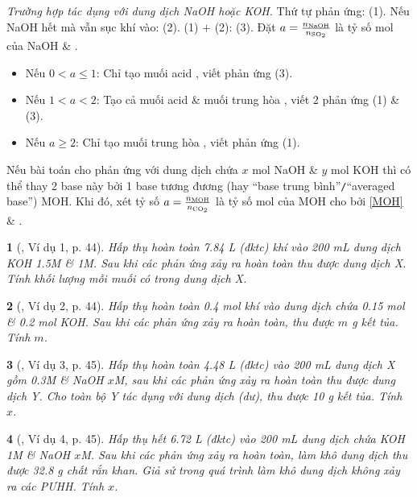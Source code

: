 \documentclass{article}
\newtheorem{baitoan}{}
\begin{document}
\noindent\textit{Trường hợp  tác dụng với dung dịch NaOH hoặc KOH.} Thứ tự phản ứng:  (1). Nếu NaOH hết mà vẫn sục khí  vào:  (2). (1) $+$ (2):  (3). Đặt $a = \frac{n_{\rm NaOH}}{n_{\ce{SO2}}}$ là tỷ số mol của NaOH \& .
\begin{itemize}
	\item Nếu $0 < a\le 1$: Chỉ tạo muối acid , viết phản ứng (3).
	\item Nếu $1 < a < 2$: Tạo cả muối acid  \& muối trung hòa , viết 2 phản ứng (1) \& (3).
	\item Nếu $a\ge 2$: Chỉ tạo muối trung hòa , viết phản ứng (1).
\end{itemize}
Nếu bài toán cho  phản ứng với dung dịch chứa $x$ mol NaOH \& $y$ mol KOH thì có thể thay 2 base này bởi 1 base tương đương (hay ``base trung bình''{\tt/}``averaged base'') MOH. Khi đó, xét tỷ số $a = \frac{n_{\rm MOH}}{n_{\ce{CO2}}}$ là tỷ số mol của MOH cho bởi \eqref{MOH} \& .

\begin{baitoan}[\cite{Truong_Long_Huong_bdhsg_Hoa_Hoc_9}, Ví dụ 1, p. 44]
	Hấp thụ hoàn toàn {\rm7.84 L} (đktc) khí {\rm{}} vào {\rm200 mL} dung dịch {\rm KOH 1.5M} \& {\rm{} 1M}. Sau khi các phản ứng xảy ra hoàn toàn thu được dung dịch X. Tính khối lượng mỗi muối có trong dung dịch X.
\end{baitoan}

\begin{baitoan}[\cite{Truong_Long_Huong_bdhsg_Hoa_Hoc_9}, Ví dụ 2, p. 44]
	Hấp thụ hoàn toàn {\rm0.4 mol} khí {\rm{}} vào dung dịch chứa {\rm0.15 mol } \& {\rm0.2 mol KOH}. Sau khi các phản ứng xảy ra hoàn toàn, thu được $m$ {\rm g} kết tủa. Tính $m$.
\end{baitoan}

\begin{baitoan}[\cite{Truong_Long_Huong_bdhsg_Hoa_Hoc_9}, Ví dụ 3, p. 45]
	Hấp thụ hoàn toàn {\rm4.48 L } (đktc) vào {\rm200 mL} dung dịch X gồm {\rm{} 0.3M \& NaOH $x$M}, sau khi các phản ứng xảy ra hoàn toàn thu được dung dịch Y. Cho toàn bộ Y tác dụng với dung dịch {\rm{}} (dư), thu được {\rm10 g} kết tủa. Tính $x$.
\end{baitoan}

\begin{baitoan}[\cite{Truong_Long_Huong_bdhsg_Hoa_Hoc_9}, Ví dụ 4, p. 45]
	Hấp thụ hết {\rm6.72 L } (đktc) vào {\rm200 mL} dung dịch chứa {\rm KOH 1M} \& {\rm NaOH $x$M}. Sau khi các phản ứng xảy ra hoàn toàn, làm khô dung dịch thu được {\rm32.8 g} chất rắn khan. Giả sử trong quá trình làm khô dung dịch không xảy ra các {\rm PƯHH}. Tính $x$.
\end{baitoan}
\end{document}
